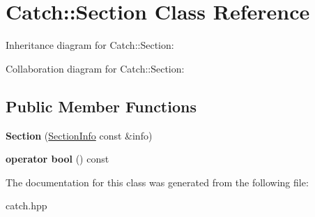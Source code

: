 \hypertarget{classCatch_1_1Section}{}\section{Catch\+:\+:Section Class Reference}
\label{classCatch_1_1Section}


Inheritance diagram for Catch\+:\+:Section\+:


Collaboration diagram for Catch\+:\+:Section\+:
\subsection*{Public Member Functions}
\begin{DoxyCompactItemize}
\item 
\mbox{\label{classCatch_1_1Section_a68fd4e51e8981aaa7ddb00d8a6abd099}} 
{\bfseries Section} (\hyperlink{structCatch_1_1SectionInfo}{Section\+Info} const \&info)
\item 
\mbox{\label{classCatch_1_1Section_a0632b804dcea1417a2970620a9742eb3}} 
{\bfseries operator bool} () const
\end{DoxyCompactItemize}


The documentation for this class was generated from the following file\+:\begin{DoxyCompactItemize}
\item 
catch.\+hpp\end{DoxyCompactItemize}
